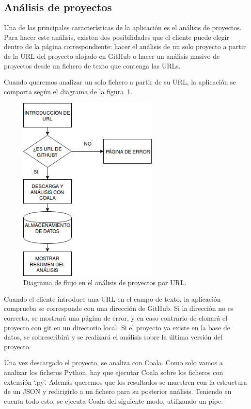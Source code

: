 \documentclass[a4paper, 12pt]{book}
\begin{document}
\subsection{Análisis de proyectos}
\label{sec:seccion12.1}
Una de las principales características de la aplicación es el análisis de proyectos. Para hacer este análisis, existen dos posibilidades que el cliente puede elegir dentro de la página correspondiente: hacer el análisis de un solo proyecto a partir de la URL del proyecto alojado en GitHub o hacer un análisis masivo de proyectos desde un fichero de texto que contenga las URLs.

Cuando queremos analizar un solo fichero a partir de su URL, la aplicación se comporta según el diagrama de la figura~\ref{fig:AnalizarURL}.
\begin{figure}[H]
  \centering
  \includegraphics[width=7cm, keepaspectratio]{img/AnalizarURL}
  \caption{Diagrama de flujo en el análisis de proyectos por URL.}
  \label{fig:AnalizarURL}
\end{figure}
Cuando el cliente introduce una URL en el campo de texto, la aplicación comprueba se corresponde con una dirección de GitHub. Si la dirección no es correcta, se mostrará una página de error, y en caso contrario de clonará el proyecto con git en un directorio local. Si el proyecto ya existe en la base de datos, se sobrescribirá y se realizará el análisis sobre la última versión del proyecto.

Una vez descargado el proyecto, se analiza con Coala. Como solo vamos a analizar los ficheros Python, hay que ejecutar Coala sobre los ficheros con extensión `.py'. Además queremos que los resultados se muestren con la estructura de un JSON y redirigirlo a un fichero para su posterior análisis. Teniendo en cuenta todo esto, se ejecuta Coala del siguiente modo, utilizando un pipe:
\end{document}
